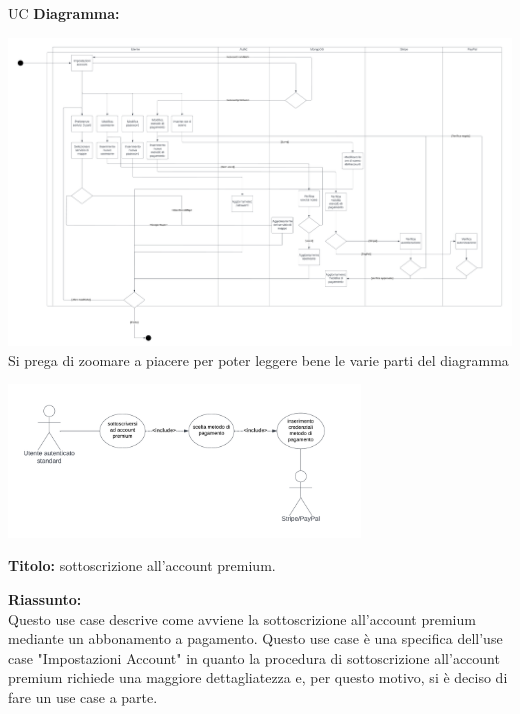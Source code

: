 \begin{listaPersonale}{UC}
    \textbf{Diagramma:}
    \begin{center}
        \includegraphics[width=1\textwidth]{img/Diagrammi/DS/DS_ImpostazioneAccount.png}\\
        Si prega di zoomare a piacere per poter leggere bene le varie parti del diagramma
    \end{center}


    \begin{listaPersonale2}[UC] {}
        \newpage

        \begin{center}
            \includegraphics[width=0.7\textwidth]{img/Diagrammi/UseCases/UtentePremium.png}
        \end{center}


        \textbf{Titolo:} sottoscrizione all'account premium.

        \textbf{Riassunto:} \\
        Questo use case descrive come avviene la sottoscrizione all'account premium mediante un abbonamento a pagamento.
        Questo use case è una specifica dell'use case "Impostazioni Account" in quanto la procedura di sottoscrizione all'account premium richiede una maggiore dettagliatezza e, per questo motivo, si è deciso di fare un use case a parte.


\end{listaPersonale2}
\end{listaPersonale}
